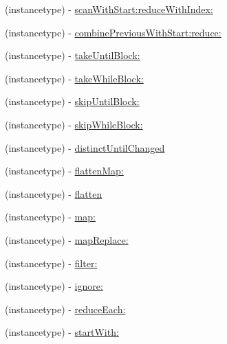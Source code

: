\begin{DoxyCompactItemize}
\item 
(instancetype) -\/ \mbox{\hyperlink{category_r_a_c_stream_07_operations_08_a69cedeb6e96a6d4154f2256fdcbe27b1}{scan\+With\+Start\+:reduce\+With\+Index\+:}}
\item 
(instancetype) -\/ \mbox{\hyperlink{category_r_a_c_stream_07_operations_08_a698f6ef68be8d3cb34f9be6efaaa5af7}{combine\+Previous\+With\+Start\+:reduce\+:}}
\item 
(instancetype) -\/ \mbox{\hyperlink{category_r_a_c_stream_07_operations_08_ac19d57150840e93112646eef310c2489}{take\+Until\+Block\+:}}
\item 
(instancetype) -\/ \mbox{\hyperlink{category_r_a_c_stream_07_operations_08_ae3b27f126fffcf5dfb8eaa6bd71c5fc4}{take\+While\+Block\+:}}
\item 
(instancetype) -\/ \mbox{\hyperlink{category_r_a_c_stream_07_operations_08_a008935d03ebc55b40b461dc080cddd38}{skip\+Until\+Block\+:}}
\item 
(instancetype) -\/ \mbox{\hyperlink{category_r_a_c_stream_07_operations_08_a1e323c308071aed5e01627d4d96ca9c8}{skip\+While\+Block\+:}}
\item 
(instancetype) -\/ \mbox{\hyperlink{category_r_a_c_stream_07_operations_08_a3af010b929b0c232ddbaa52f574fb888}{distinct\+Until\+Changed}}
\item 
(instancetype) -\/ \mbox{\hyperlink{category_r_a_c_stream_07_operations_08_a2441b0306adc6ae2845219f8b116119a}{flatten\+Map\+:}}
\item 
(instancetype) -\/ \mbox{\hyperlink{category_r_a_c_stream_07_operations_08_a02767823dfe3d4682709e066e15e388c}{flatten}}
\item 
(instancetype) -\/ \mbox{\hyperlink{category_r_a_c_stream_07_operations_08_ae8e14cc70fb3979e6128d28b003bba3f}{map\+:}}
\item 
(instancetype) -\/ \mbox{\hyperlink{category_r_a_c_stream_07_operations_08_a9e55da434f4cf84e14f9133ac48383b8}{map\+Replace\+:}}
\item 
(instancetype) -\/ \mbox{\hyperlink{category_r_a_c_stream_07_operations_08_ae6a990d05708acea33f1c31102f4989b}{filter\+:}}
\item 
(instancetype) -\/ \mbox{\hyperlink{category_r_a_c_stream_07_operations_08_aa0bf73c86006176e745390ee2b3645b2}{ignore\+:}}
\item 
(instancetype) -\/ \mbox{\hyperlink{category_r_a_c_stream_07_operations_08_aaf04bf295d943b85860ae5cc3d5851ff}{reduce\+Each\+:}}
\item 
(instancetype) -\/ \mbox{\hyperlink{category_r_a_c_stream_07_operations_08_a2f255fad695085b91a1ebc1e0a78c865}{start\+With\+:}}

\end{DoxyCompactItemize}
